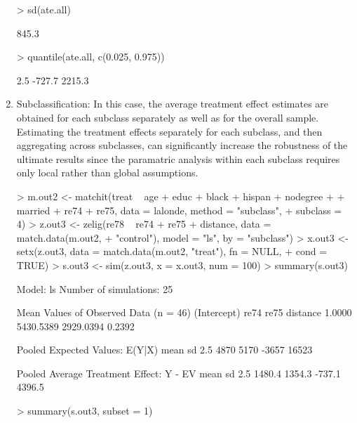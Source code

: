 \begin{enumerate}
\begin{Schunk}
\begin{Soutput}
\end{Soutput}
\begin{Sinput}
> sd(ate.all)
\end{Sinput}
\begin{Soutput}
[1] 845.3

\end{Soutput}
\begin{Sinput}
> quantile(ate.all, c(0.025, 0.975))
\end{Sinput}
\begin{Soutput}
  2.5%  97.5% 
-727.7 2215.3 

\end{Soutput}
\end{Schunk}
  
\item Subclassification: In this case, the average treatment effect
  estimates are obtained for each subclass separately as well as
  for the overall sample.  Estimating the treatment effects separately 
  for each subclass, and then aggregating across subclasses, can significantly
  increase the robustness of the ultimate results since the paramatric analysis
  within each subclass requires only local rather than global assumptions.

\begin{Schunk}
\begin{Sinput}
> m.out2 <- matchit(treat ~ age + educ + black + hispan + nodegree + 
+     married + re74 + re75, data = lalonde, method = "subclass", 
+     subclass = 4)
> z.out3 <- zelig(re78 ~ re74 + re75 + distance, data = match.data(m.out2, 
+     "control"), model = "ls", by = "subclass")
> x.out3 <- setx(z.out3, data = match.data(m.out2, "treat"), fn = NULL, 
+     cond = TRUE)
> s.out3 <- sim(z.out3, x = x.out3, num = 100)
> summary(s.out3)
\end{Sinput}
\begin{Soutput}

  Model: ls 
  Number of simulations: 25 

Mean Values of Observed Data (n = 46) 
(Intercept)        re74        re75    distance 
     1.0000   5430.5389   2929.0394      0.2392 

Pooled Expected Values: E(Y|X)
 mean    sd  2.5% 97.5% 
 4870  5170 -3657 16523 

Pooled Average Treatment Effect: Y - EV
  mean     sd   2.5%  97.5% 
1480.4 1354.3 -737.1 4396.5 

\end{Soutput}
\begin{Sinput}
> summary(s.out3, subset = 1)
\end{Sinput}
\begin{Soutput}


\end{Soutput}
\end{Schunk}
\end{enumerate}
